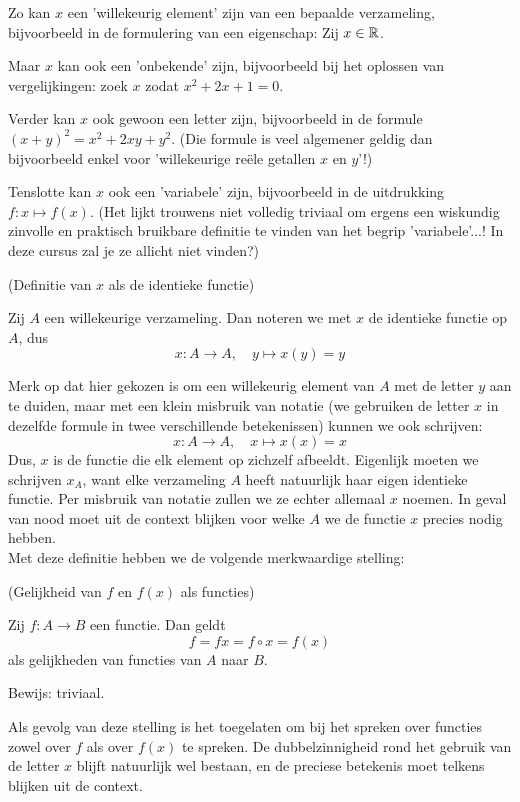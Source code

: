 \documentclass{ximera}
\begin{document}
Zo kan $x$ een 'willekeurig element' zijn van een bepaalde verzameling, bijvoorbeeld in de formulering van een eigenschap: Zij $x\in\mathbb{R}$.

Maar $x$ kan ook een 'onbekende' zijn, bijvoorbeeld bij het oplossen van vergelijkingen: zoek $x$ zodat $x^2+2x+1=0$. 

Verder kan $x$ ook gewoon een letter zijn, bijvoorbeeld in de formule $(x+y)^2 = x^2+2xy+y^2$. (Die formule is veel algemener geldig dan bijvoorbeeld enkel voor 'willekeurige reële getallen $x$ en $y$'!)

Tenslotte kan $x$ ook een 'variabele' zijn, bijvoorbeeld in de uitdrukking $f:x\mapsto f(x)$. (Het lijkt trouwens niet volledig triviaal om ergens een wiskundig zinvolle en praktisch bruikbare definitie te vinden van het begrip 'variabele'...! In deze cursus zal je ze allicht niet vinden?)


\begin{definition} (Definitie van $x$ als de identieke functie)
    
    Zij $A$ een willekeurige verzameling. Dan noteren we met $x$ de identieke functie op $A$, dus
    $$
    x:A \to A,\quad y \mapsto x(y) = y
    $$
\end{definition}
Merk op dat hier gekozen is om een willekeurig element van $A$ met de letter $y$ aan te duiden, maar met een klein misbruik van notatie (we gebruiken de letter $x$ in dezelfde formule in twee verschillende betekenissen) kunnen we ook schrijven:
$$
    x:A \to A,\quad x \mapsto x(x) = x
$$
Dus, $x$ is de functie die elk element op zichzelf afbeeldt. Eigenlijk moeten we schrijven $x_A$, want elke verzameling $A$ heeft natuurlijk haar eigen identieke functie. Per misbruik van notatie zullen we ze echter allemaal $x$ noemen. In geval van nood moet uit de context blijken voor welke $A$ we de functie $x$ precies nodig hebben.
\\

Met deze definitie hebben we de volgende merkwaardige stelling:
\begin{proposition} (Gelijkheid van $f$ en $f(x)$ als functies)
    
    Zij $f:A\to B$ een functie. Dan geldt    
    $$
    f = fx = f\circ x = f(x)
    $$
    als gelijkheden van functies van $A$ naar $B$.
\end{proposition}
Bewijs: triviaal.

Als gevolg van deze stelling is het toegelaten om bij het spreken over functies zowel over $f$ als over $f(x)$ te spreken. De dubbelzinnigheid rond het gebruik van de letter $x$ blijft natuurlijk wel bestaan, en de preciese betekenis moet telkens blijken uit de context.
\end{document}

